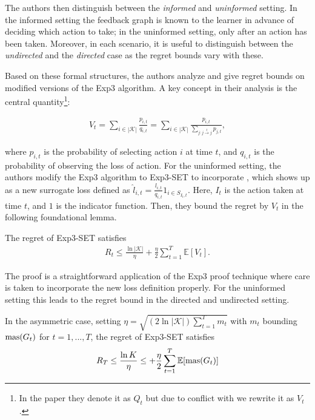 The authors then distinguish between the \textit{informed} and \textit{uninformed} setting. In the informed setting the feedback graph is known to the learner in advance of deciding which action to take; in the uninformed setting, only after an action has been taken. Moreover, in each scenario, it is useful to distinguish between the \textit{undirected} and the \textit{directed} case as the regret bounds vary with these. 

Based on these formal structures, the authors analyze and give regret bounds on modified versions of the Exp3 algorithm. A key concept in their analysis is the central quantity\footnote{In the paper they denote it as $Q_t$ but due to conflict with \citep{hazan} we rewrite it as $V_t$.}:

\begin{align}\label{alon:foundation}
	V_t=\sum_{i\in |\mathcal{K}|}\frac{p_{i,t}}{q_{i,t}} = \sum_{i\in |\mathcal{K}|}\frac{p_{i,t}}{\sum_{j:j\overset{t}{\to}j} p_{j,t}},
\end{align}

where $p_{i,t}$ is the probability of selecting action $i$ at time $t$, and $q_{i,t}$ is the probability of observing the loss of action. For the uninformed setting, the authors modify the Exp3 algorithm to Exp3-SET to incorporate \label{alon:foundation}, which shows up as a new surrogate loss defined as $\hat{l}_{i,t}=\frac{l_{i,t}}{q_{i,t}}1_{i\in S_{I_t,t}}$. Here, $I_t$ is the action taken at time $t$, and $1$ is the indicator function. Then, they bound the regret by $V_t$ in the following foundational lemma.

\begin{lemma}
	The regret of Exp3-SET satisfies
	\begin{align}
		R_t\leq \frac{\ln |\mathcal{K}|}{\eta} + \frac{\eta}{2}\sum_{t=1}^T\mathbb{E}[V_t].
	\end{align}
\end{lemma}

The proof is a straightforward application of the Exp3 proof technique where care is taken to incorporate the new loss definition properly. For the uninformed setting this leads to the regret bound in the directed and undirected setting.

\begin{theorem} \label{alon:undirected}
	In the asymmetric case, setting $\eta=\sqrt{(2\ln |\mathcal{K}|)\sum_{t=1}^Tm_t}$ with $m_t$ bounding $\text{mas}(G_t)$ for $t=1,...,T$, the regret of Exp3-SET satisfies 
	\begin{align}
		R_T\leq \frac{\ln K}{\eta} \leq +\frac{\eta}{2}\sum_{t=1}^T\mathbb{E}[\text{mas}(G_t)]
	\end{align}
\end{theorem} 

